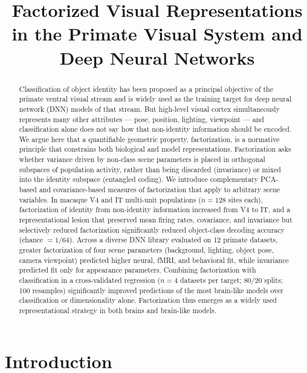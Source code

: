 \documentclass[11pt]{article}
\title{Factorized Visual Representations in the Primate Visual System and Deep Neural Networks}
\date{}
\begin{document}
\maketitle

\begin{abstract}
Classification of object identity has been proposed as a principal objective
of the primate ventral visual stream and is widely used as the training
target for deep neural network (DNN) models of that stream. But high-level
visual cortex simultaneously represents many other attributes --- pose,
position, lighting, viewpoint --- and classification alone does not say how
that non-identity information should be encoded. We argue here that a
quantifiable geometric property, factorization, is a normative principle
that constrains both biological and model representations. Factorization
asks whether variance driven by non-class scene parameters is placed in
orthogonal subspaces of population activity, rather than being discarded
(invariance) or mixed into the identity subspace (entangled coding). We
introduce complementary PCA-based and covariance-based measures of
factorization that apply to arbitrary scene variables. In macaque V4 and IT
multi-unit populations (\(n=128\) sites each), factorization of identity
from non-identity information increased from V4 to IT, and a representational
lesion that preserved mean firing rates, covariance, and invariance but
selectively reduced factorization significantly reduced object-class
decoding accuracy (chance \(=1/64\)). Across a diverse DNN library evaluated
on 12 primate datasets, greater factorization of four scene parameters
(background, lighting, object pose, camera viewpoint) predicted higher
neural, fMRI, and behavioral fit, while invariance predicted fit only for
appearance parameters. Combining factorization with classification in a
cross-validated regression (\(n=4\) datasets per target; 80/20 splits; 100
resamples) significantly improved predictions of the most brain-like models
over classification or dimensionality alone. Factorization thus emerges as a
widely used representational strategy in both brains and brain-like models.
\end{abstract}

\section{Introduction}
\end{document}
